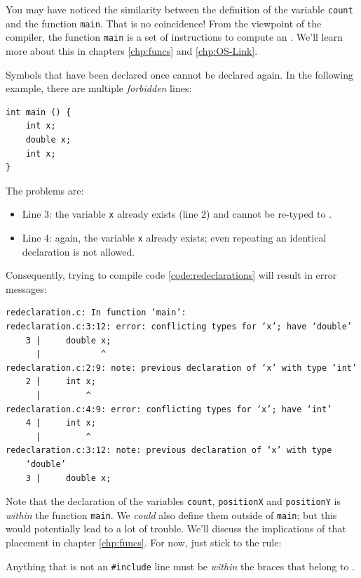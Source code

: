 You may have noticed the similarity between the definition of the variable \texttt{count} and the function \texttt{main}. That is no coincidence! From the viewpoint of the compiler, the function \texttt{main} is a set of instructions to compute an . We'll learn more about this in chapters \ref{chp:funcs} and \ref{chp:OS-Link}.

\begin{warnbox}
Symbols that have been declared once cannot be declared again. In the following example, there are multiple \emph{forbidden} lines:
\begin{codebox}[redeclaration.c]
\begin{verbatim}
int main () {
    int x;
    double x;
    int x;
}
\end{verbatim}
 \label{code:redeclarations}
\end{codebox}
The problems are: \vspace{-6pt}
\begin{itemize}
\setlength\itemsep{-3pt}
\item Line 3: the variable \texttt{x} already exists (line 2) and cannot be re-typed to .
\item Line 4: again, the variable \texttt{x} already exists; even repeating an identical declaration is not allowed.
\end{itemize}

Consequently, trying to compile code \ref{code:redeclarations} will result in error messages:
\begin{cmdbox}
\begin{verbatim}
redeclaration.c: In function ‘main’:
redeclaration.c:3:12: error: conflicting types for ‘x’; have ‘double’
    3 |     double x;
      |            ^
redeclaration.c:2:9: note: previous declaration of ‘x’ with type ‘int’
    2 |     int x;
      |         ^
redeclaration.c:4:9: error: conflicting types for ‘x’; have ‘int’
    4 |     int x;
      |         ^
redeclaration.c:3:12: note: previous declaration of ‘x’ with type
    ‘double’
    3 |     double x;
\end{verbatim}
\end{cmdbox}
\end{warnbox}

\begin{warnbox}
Note that the declaration of the variables \texttt{count}, \texttt{positionX} and \texttt{positionY} is \emph{within} the function \texttt{main}. We \emph{could} also define them outside of \texttt{main}; but this would potentially lead to a lot of trouble. We'll discuss the implications of that placement in chapter \ref{chp:funcs}. For now, just stick to the rule:

Anything that is not an \texttt{\#include} line must be \emph{within} the braces that belong to .
\end{warnbox}

